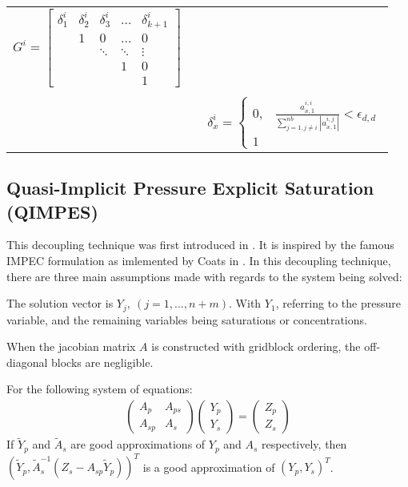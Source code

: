 \begin{table}[h!]
\begin{tabularx}{\linewidth}{c||l||c}
$G^{i} = \begin{bmatrix}
	\delta_{1}^{i} &\delta_{2}^{i}&\delta_{3}^{i}& \dots &\delta_{k+1}^{i} \\
 & 1 & 0 & \dots & 0 \\
 &  & \ddots & \ddots & \vdots \\
 &  &  & 1 & 0 \\
 &  &  &  & 1 
\end{bmatrix} $\\
	&&\\
	&&
$\delta_{x}^{i} = \begin{cases} 
0, & \frac{a_{x,1}^{i,i}}{\sum_{j=1,j\neq i}^{nb} |a_{x,1}^{i,j}|} < \epsilon_{d,d} \\  
1 & 
     \end{cases} $\\
    \bottomrule
\end{tabularx}
\end{table}

\subsection{Quasi-Implicit Pressure Explicit Saturation (QIMPES)}
This decoupling technique was first introduced in \cite{IPARSdecoupling}. It is inspired by the famous IMPEC formulation as imlemented by Coats in \cite{impescoats}.
In this decoupling technique, there are three main assumptions made with regards to the system being solved:
\begin{assumption}
	The solution vector is ${Y_{j}}, \ (j=1,...,n+m)$. With $Y_{1}$, referring to the pressure variable, and the remaining variables being
	saturations or concentrations.
\end{assumption}

\begin{assumption}
	When the jacobian matrix $A$ is constructed with gridblock ordering, the off-diagonal blocks are negligible.
\end{assumption}

\begin{assumption}
	For the following system of equations:
	\begin{align}
		\begin{pmatrix}
			A_{p}&A_{ps}\\
			A_{sp}&A_{s}
		\end{pmatrix} 
		\begin{pmatrix}
			Y_{p}\\
			Y_{s}
		\end{pmatrix} 
		= 
		\begin{pmatrix}
			Z_{p}\\
			Z_{s}
		\end{pmatrix} 
	\end{align}
	If $\tilde{Y}_{p}$ and $\tilde{A}_{s}$ are good approximations of $Y_{p}$ and $A_{s}$ respectively,
	then $(\tilde{Y}_{p}, \tilde{A}_{s}^{-1}(Z_{s}-A_{sp}\tilde{Y}_{p}))^{T}$ is a good approximation of $(Y_{p}, Y_{s})^{T}$.
\end{assumption}

